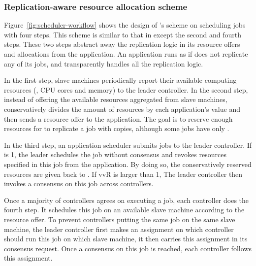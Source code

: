 \vspace{-.15in}\subsubsection{Replication-aware resource allocation scheme}
\label{sec:workflow}\vspace{-.075in}

Figure~\ref{fig:scheduler-workflow} shows the design of \tripod's scheme on 
scheduling jobs with four steps. This scheme is similar to that in \mesos 
except the second and fourth steps. These two steps \tripod abstract away the 
replication logic in its resource offers and allocations from the application. 
An application runs as if \xxx does not replicate any of its jobs, and \tripod 
transparently handles all the replication logic.

In the first step, slave machines periodically report their available computing 
resources (\eg, CPU cores and memory) to the leader controller. In the second 
step, instead of offering the available resources aggregated from slave 
machines, \tripod conservatively divides the amount of resources by each 
application's  value and then sends a resource offer to the application. 
The goal is to reserve enough resources for \tripod to replicate a job with 
 copies, although some jobs have only .

In the third step, an application scheduler submits jobs to the leader 
controller. If  is 1, the leader schedules the job without consensus and 
revokes  resources specified in this job from the application. By doing 
so, the conservatively reserved resources are given back to \tripod. If vv{R} 
is larger than 1, The leader controller then invokes a consensus on this job 
across controllers.

Once a majority of controllers agrees on executing a job, each controller 
does the fourth step. It schedules this job on an available slave machine 
according to the resource offer. To prevent controllers putting the same job on 
the same slave machine, the leader controller first makes an assignment on 
which controller should run this job on which slave machine, it then carries 
this assignment in its consensus request. Once a consensus on this job is 
reached, each controller follows this assignment.



